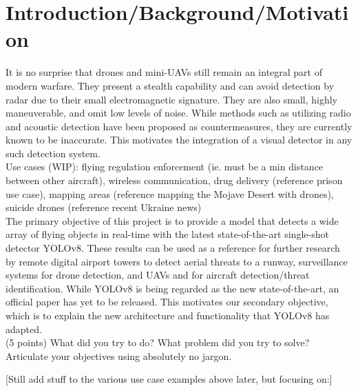 \documentclass[10pt,twocolumn,letterpaper]{article}
\begin{document}
\section{Introduction/Background/Motivation}
It is no surprise that drones and mini-UAVs still remain an integral part of modern warfare. They present a stealth capability 
and can avoid detection by radar due to their small electromagnetic signature. They are also small, highly maneuverable, and 
omit low levels of noise. While methods such as utilizing radio and acoustic detection have been proposed as countermeasures, they 
are currently known to be inaccurate. This motivates the integration of a visual detector in any such detection system.\\
Use cases (WIP): flying regulation enforcement (ie. must be a min distance between other aircraft), wireless communication, drug delivery (reference prison use case), mapping areas (reference mapping the Mojave Desert with drones), suicide drones (reference recent Ukraine news)\\
The primary objective of this project is to provide a model that detects a wide array of flying objects in real-time with the latest 
state-of-the-art single-shot detector YOLOv8. These results can be used as a reference for further research by remote digital airport 
towers to detect aerial threats to a runway, surveillance systems for drone detection, and UAVs and for aircraft detection/threat identification. 
While YOLOv8 is being regarded as the new state-of-the-art, an official paper has yet to be released. This motivates our secondary objective, 
which is to explain the new architecture and functionality that YOLOv8 has adapted.\\
(5 points) What did you try to do? What problem did you try to solve? Articulate your objectives using absolutely no jargon. 

[Still add stuff to the various use case examples above later, but focusing on:]
    
\end{document}
